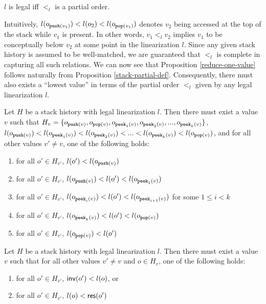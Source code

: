 \begin{proposition}\label{stack-partial-def}
    $l$ is legal iff $<_l$ is a partial order.
\end{proposition}

Intuitively, $l(o_{{\tt push}(v_1)}) < l(o_2) < l(o_{{\tt pop}(v_1)})$ denotes $v_2$ being accessed at the top of the stack while $v_1$ is present. In other words, $v_1 <_l v_2$ implies $v_1$ to be conceptually below $v_2$ at some point in the linearization $l$. Since any given stack history is assumed to be well-matched, we are guaranteed that $<_l$ is complete in capturing all such relations. We can now see that Proposition \ref{reduce-one-value} follows naturally from Proposition \ref{stack-partial-def}. Consequently, there must also exists a ``lowest value'' in terms of the partial order $<_l$ given by any legal linearization $l$.

\begin{corollary}
    Let $H$ be a stack history with legal linearization $l$. Then there must exist a value $v$ such that $H_v = \{o_{{\tt push}(v)}, o_{{\tt pop}(v)}, o_{{\tt peek}_1(v)}, o_{{\tt peek}_2(v)}, ..., o_{{\tt peek}_k(v)}\}$, $l(o_{{\tt push}(v)}) < l(o_{{\tt peek}_1(v)}) < l(o_{{\tt peek}_2(v)}) < ... < l(o_{{\tt peek}_k(v)}) < l(o_{{\tt pop}(v)})$, and for all other values $v' \neq v$, one of the following holds:
    \begin{enumerate}
        \item for all $o' \in H_{v'}$, $l(o') < l(o_{{\tt push}(v)})$
        \item for all $o' \in H_{v'}$, $l(o_{{\tt push}(v)}) < l(o') < l(o_{{\tt peek}_1(v)})$
        \item for all $o' \in H_{v'}$, $l(o_{{\tt peek}_i(v)}) < l(o') < l(o_{{\tt peek}_{i+1}(v)})$ for some $1 \leq i < k$
        \item for all $o' \in H_{v'}$, $l(o_{{\tt peek}_k(v)}) < l(o') < l(o_{{\tt pop}(v)})$
        \item for all $o' \in H_{v'}$, $l(o_{{\tt pop}(v)}) < l(o')$
    \end{enumerate}
\end{corollary}

\begin{corollary}\label{lin-exist-v}
    Let $H$ be a stack history with legal linearization $l$. Then there must exist a value $v$ such that for all other values $v' \neq v$ and $o \in H_v$, one of the following holds:
    \begin{enumerate}
        \item for all $o' \in H_{v'}$, ${\sf inv}(o') < l(o)$, or
        \item for all $o' \in H_{v'}$, $l(o) < {\sf res}(o')$
    \end{enumerate}
\end{corollary}

